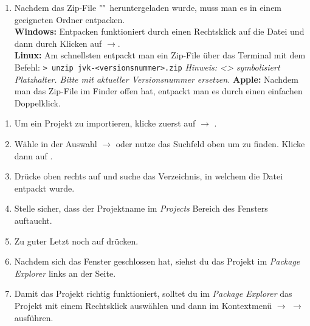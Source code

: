 
\label{ex1}

\begin{Infobox}
    \begin{enumerate}[label=\arabic*.]

        \item Nachdem das Zip-File "\jvkpackage"\ heruntergeladen wurde, muss man es in einem geeigneten Ordner entpacken.\\
        \textbf{Windows:} Entpacken funktioniert durch einen Rechtsklick auf die Datei und dann durch Klicken auf $\to$.\\
        \textbf{Linux:} Am schnellsten entpackt man ein Zip-File über das Terminal mit dem Befehl:
        \newline\hspace*{\fill}\texttt{\textgreater\ unzip jvk-<versionsnummer>.zip}\hspace*{\fill}\newline
        \textit{Hinweis: <> symbolisiert Platzhalter. Bitte mit aktueller Versionsnummer ersetzen.}\newline
        \textbf{Apple:} Nachdem man das Zip-File im Finder offen hat, entpackt man es durch einen einfachen Doppelklick.
    \end{enumerate}
\end{Infobox}


\begin{Infobox}
    \begin{enumerate}[label=\arabic*.]
        \item Um ein Projekt zu importieren, klicke zuerst auf  $\to$ .
        \item Wähle in der Auswahl  $\to$  oder nutze das Suchfeld oben um  zu finden. Klicke dann auf .
        \item Drücke oben rechts auf  und suche das Verzeichnis, in welchem die Datei \jvkpackage { }entpackt wurde.
        \item Stelle sicher, dass der Projektname im \textit{Projects} Bereich des Fensters auftaucht.
        \item Zu guter Letzt noch auf  drücken.
        \item Nachdem sich das Fenster geschlossen hat, siehst du das Projekt im \textit{Package Explorer} links an der Seite.
        \item Damit das Projekt richtig funktioniert, solltet du im \textit{Package Explorer} das Projekt mit einem Rechtsklick auswählen und dann im Kontextmenü  $\to$  $\to$  ausführen.
    \end{enumerate}
\end{Infobox}


